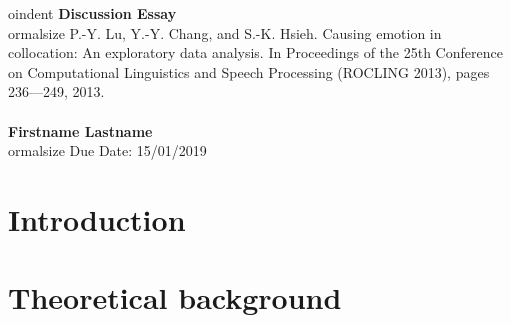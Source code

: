 \documentclass[a4paper, 12pt]{article}
\begin{document}

oindent
\large\textbf{Discussion Essay} \\  

ormalsize P.-Y. Lu, Y.-Y. Chang, and S.-K. Hsieh.  Causing emotion in collocation:  An exploratory data analysis. In Proceedings of the 25th Conference on Computational Linguistics and Speech Processing (ROCLING 2013), pages 236---249, 2013.
\\ \\
\textbf{Firstname Lastname} \\

ormalsize   Due Date: 15/01/2019


\section*{Introduction}
\lipsum[1]

\section*{Theoretical background}
\lipsum[2]
\cite{lu2013causing}








\end{document}
